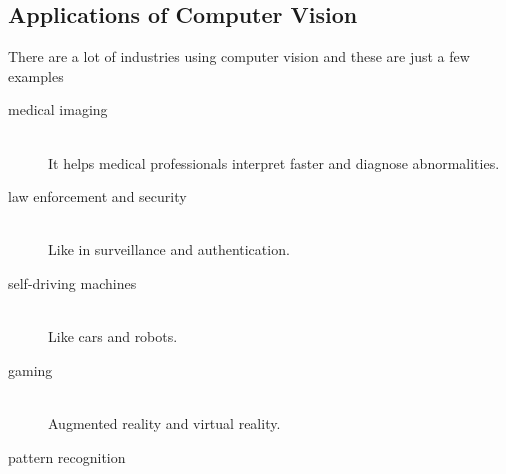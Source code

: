     \subsection{Applications of Computer Vision}
        There are a lot of industries using computer vision and these are just a few examples  ~\cite{mldlcv}
        \begin{description}
        \item[medical imaging] \hfill \\ 
            It helps medical professionals interpret faster and diagnose abnormalities.
        \item[law enforcement and security] \hfill \\
            Like in surveillance and authentication.
        \item[self-driving machines] \hfill \\ Like cars and robots.
        \item[gaming] \hfill \\ Augmented reality and virtual reality.
        \item[pattern recognition] \hfill \\
        \end{description}

